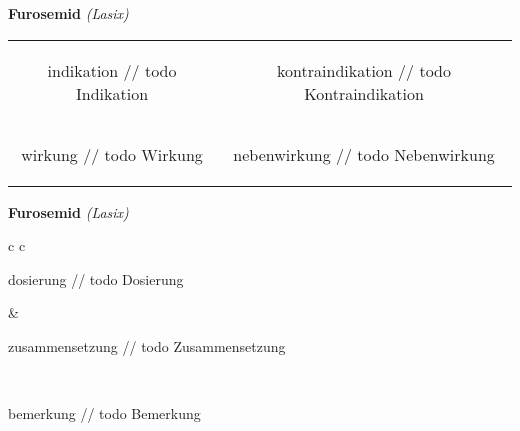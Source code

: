\documentclass[12pt]{beamer}
\begin{document}
\begin{frame}{
    \textbf{Furosemid}
    \textit{(Lasix)}
}
    \begin{tabular}{c c}
        \begin{beamercolorbox}[wd=\boxwidth\textwidth,ht=\boxheight\textheight,sep=1em]{indikation}
        // todo Indikation
        \end{beamercolorbox} & 
        \begin{beamercolorbox}[wd=\boxwidth\textwidth,ht=\boxheight\textheight,sep=1em]{kontraindikation}
        // todo Kontraindikation 
        \end{beamercolorbox} \\
        \begin{beamercolorbox}[wd=\boxwidth\textwidth,ht=\boxheight\textheight,sep=1em]{wirkung}
        // todo Wirkung
        \end{beamercolorbox} & 
        \begin{beamercolorbox}[wd=\boxwidth\textwidth,ht=\boxheight\textheight,sep=1em]{nebenwirkung}
        // todo Nebenwirkung
        \end{beamercolorbox} \\
    \end{tabular}
\end{frame}

\begin{frame}{
    \textbf{Furosemid}
    \textit{(Lasix)}
}
    \begin{tabular}{c c}
        \begin{beamercolorbox}[wd=\boxwidth\textwidth,ht=\boxheight\textheight,sep=1em]{dosierung}
        // todo Dosierung
        \end{beamercolorbox} & 
        \begin{beamercolorbox}[wd=\boxwidth\textwidth,ht=\boxheight\textheight,sep=1em]{zusammensetzung}
        // todo Zusammensetzung
        \end{beamercolorbox} \\
        \begin{beamercolorbox}[wd=\textwidth,ht=\boxheight\textheight,sep=1em]{bemerkung}
        // todo Bemerkung
        \end{beamercolorbox} \\
    \end{tabular}
\end{frame}
\end{document}
